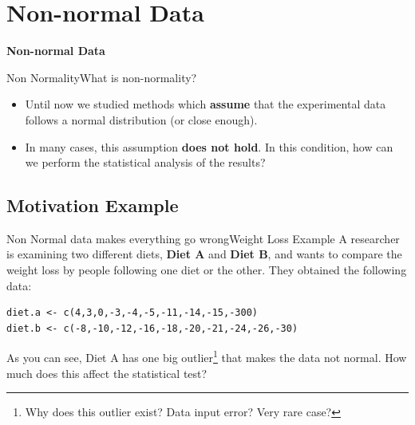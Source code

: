 \section{Non-normal Data}

\begin{frame}

  \begin{center}
    {\bf Non-normal Data}
  \end{center}

\end{frame}

\begin{frame}{Non Normality}{What is non-normality?}
  \begin{itemize}
    \item Until now we studied methods which {\bf assume} that the experimental
      data follows a normal distribution (or close enough).\bigskip
    \item In many cases, this assumption {\bf does not hold}. In this condition,
      how can we perform the statistical analysis of the results?
  \end{itemize}
\end{frame}

\subsection{Motivation Example}

\begin{frame}[fragile]{Non Normal data makes everything go wrong}{Weight Loss Example}
A researcher is examining two different diets, {\bf Diet A} and {\bf Diet B},
and wants to compare the weight loss by people following one diet or the other.
They obtained the following data:

\begin{verbatim}
diet.a <- c(4,3,0,-3,-4,-5,-11,-14,-15,-300)
diet.b <- c(-8,-10,-12,-16,-18,-20,-21,-24,-26,-30)
\end{verbatim}
\bigskip

As you can see, Diet A has one big outlier\footnote{Why does this outlier exist? Data input error? Very rare case?} that makes the data not normal. How much does this affect the statistical test?
\end{frame}

